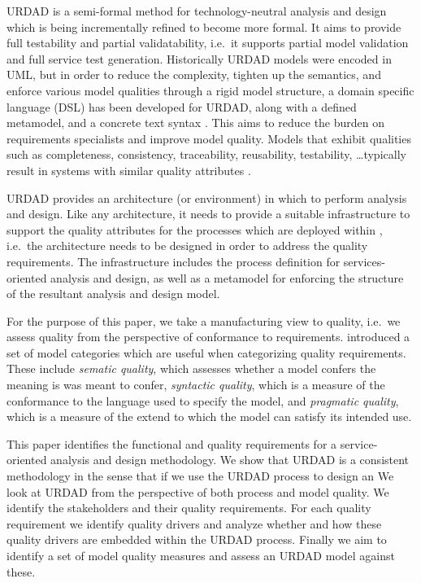 URDAD is a semi-formal method for technology-neutral analysis and design \cite{solms_urdad_2010} which is being incrementally refined to become more formal. It aims to provide full testability and partial validatability, i.e.\ it supports partial model validation and full service test generation. Historically URDAD models were encoded in UML, but in order to reduce the complexity, tighten up the semantics, and enforce various model qualities through a rigid model structure, a domain specific language (DSL) has been developed for URDAD, along with a defined metamodel, and a concrete text syntax \cite{solmsfritz_domain-specific_????}. This aims to reduce the burden on requirements specialists and improve model quality. Models that exhibit qualities such as completeness, consistency, traceability, reusability, testability, \dots typically result in systems with similar quality attributes \cite{findItIfYouCan}.

URDAD provides an architecture (or environment) in which to perform analysis and design. Like any architecture, it needs to provide a suitable infrastructure to support the quality attributes for the processes which are deployed within \cite{}, i.e.\ the architecture needs to be designed in order to address the quality requirements. The infrastructure includes the process definition for services-oriented analysis and design, as well as a metamodel for enforcing the structure of the resultant analysis and design model.

For the purpose of this paper, we take a manufacturing view \cite{garvin_what_1984} to quality, i.e.\ we assess quality from the perspective of conformance to requirements. \cite{lindland_understanding_1994} introduced a set of model categories which are useful when categorizing quality requirements. These include \emph{sematic quality}, which assesses whether a model confers the meaning is was meant to confer, \emph{syntactic quality}, which is a measure of the conformance to the language used to specify the model, and \emph{pragmatic quality}, which is a measure of the extend to which the model can satisfy its intended use.

This paper identifies the functional and quality requirements for a service-oriented analysis and design methodology. We show that URDAD is a consistent methodology in the sense that if we use the URDAD process to design an 
We look at URDAD from the perspective of both process and model quality. We identify the stakeholders and their quality requirements. For each quality requirement we identify quality drivers and analyze whether and how these quality drivers are embedded within the URDAD process. Finally we aim to identify a set of model quality measures and assess an URDAD model against these.
